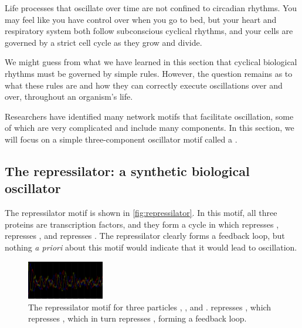 Life processes that oscillate over time are not confined to circadian rhythms. You may feel like you have control over when you go to bed, but your heart and respiratory system both follow subconscious cyclical rhythms, and your cells are governed by a strict cell cycle as they grow and divide.

We might guess from what we have learned in this section that cyclical biological rhythms must be governed by simple rules. However, the question remains as to what these rules are and how they can correctly execute oscillations over and over, throughout an organism's life.

Researchers have identified many network motifs that facilitate oscillation, some of which are very complicated and include many components. In this section, we will focus on a simple three-component oscillator motif called a .

\FloatBarrier
{}
\subsection{The repressilator: a synthetic biological oscillator}

The repressilator motif is shown in \autoref{fig:repressilator}. In this motif, all three proteins are transcription factors, and they form a cycle in which  represses ,  represses , and  represses . The repressilator clearly forms a feedback loop, but nothing \textit{a priori} about this motif would indicate that it would lead to oscillation.\\

\begin{figure}[h]
\centering
\mySfFamily
\includegraphics[width = 0.3\textwidth]{../images/cellblender_repressilator.png}
\caption{The repressilator motif for three particles , , and .  represses , which represses , which in turn represses , forming a feedback loop.}
\label{fig:repressilator}
\end{figure}

